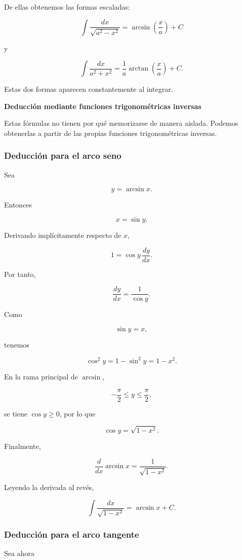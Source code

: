 \documentclass[12pt]{article}
\theoremstyle{definition}
\theoremstyle{remark}
\begin{document}
De ellas obtenemos las formas escaladas:

\[
\boxed{
\int\frac{dx}{\sqrt{a^2-x^2}}
=
\arcsin\left(\frac{x}{a}\right)+C
}
\]

y

\[
\boxed{
\int\frac{dx}{a^2+x^2}
=
\frac1a\arctan\left(\frac{x}{a}\right)+C.
}
\]

Estas dos formas aparecen constantemente al integrar.

\textbf{Deducción mediante funciones trigonométricas inversas}

Estas fórmulas no tienen por qué memorizarse de manera aislada.
Podemos obtenerlas a partir de las propias funciones trigonométricas
inversas.
\subsubsection*{Deducción para el arco seno}
Sea

\[
y=\arcsin x.
\]

Entonces

\[
x=\sin y.
\]

Derivando implícitamente respecto de \(x\),

\[
1=\cos y\,\frac{dy}{dx}.
\]

Por tanto,

\[
\frac{dy}{dx}
=
\frac1{\cos y}.
\]

Como

\[
\sin y=x,
\]

tenemos

\[
\cos^2y
=
1-\sin^2y
=
1-x^2.
\]

En la rama principal de \(\arcsin\),

\[
-\frac{\pi}{2}\le y\le\frac{\pi}{2},
\]

se tiene \(\cos y\ge0\), por lo que

\[
\cos y=\sqrt{1-x^2}.
\]

Finalmente,

\[
\boxed{
\frac{d}{dx}\arcsin x
=
\frac1{\sqrt{1-x^2}}
}.
\]

Leyendo la derivada al revés,

\[
\boxed{
\int\frac{dx}{\sqrt{1-x^2}}
=
\arcsin x+C.
}
\]
\subsubsection*{Deducción para el arco tangente}
Sea ahora
\end{document}
